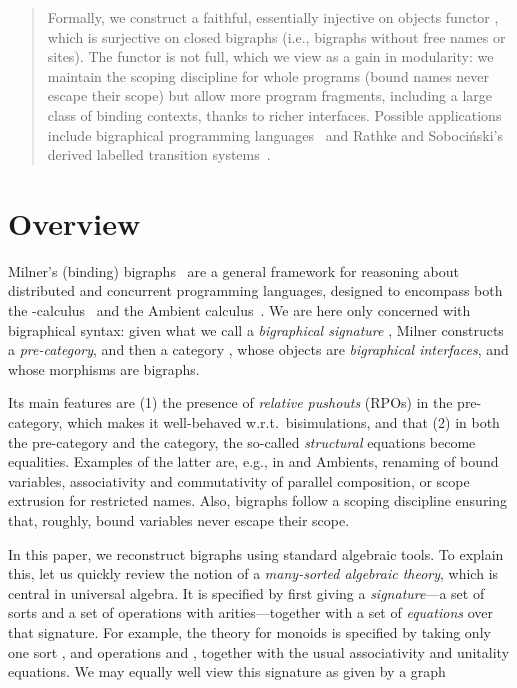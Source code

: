 \documentclass{llncs}
\begin{document}
\begin{abstract}
  Formally, we construct a faithful, essentially injective on objects
  functor , which is surjective on
  closed bigraphs (i.e., bigraphs without free names or sites).  The
  functor is not full, which we view as a gain in modularity: we
  maintain the scoping discipline for whole programs (bound names
  never escape their scope) but allow more program fragments,
  including a large class of binding contexts, thanks to richer
  interfaces.  Possible applications include bigraphical programming
  languages~\cite{Damgaard:Matching} and Rathke and Soboci\'{n}ski's
  derived labelled transition systems~\cite{modularLTS}.
  \end{abstract}

\section{Overview}
Milner's (binding) bigraphs~\cite{Milner:bigraphs} are a general
framework for reasoning about distributed and concurrent programming
languages, designed to encompass both the
-calculus~\cite{Milner:pi} and the Ambient
calculus~\cite{Ambients}.  We are here only concerned with bigraphical
syntax: given what we call a \emph{bigraphical signature} ,
Milner constructs a \emph{pre-category}, and then a category , whose objects are \emph{bigraphical interfaces}, and whose
morphisms are bigraphs.

Its main features are (1) the presence of \emph{relative pushouts}
(RPOs) in the pre-category, which makes it well-behaved w.r.t.\
bisimulations, and that (2) in both the pre-category and the category,
the so-called \emph{structural} equations become equalities. Examples
of the latter are, e.g., in  and Ambients, renaming of bound
variables, associativity and commutativity of parallel composition, or
scope extrusion for restricted names. Also, bigraphs follow a scoping
discipline ensuring that, roughly, bound variables never escape their
scope.

In this paper, we reconstruct bigraphs using standard algebraic tools.
To explain this, let us quickly review the notion of a
\emph{many-sorted algebraic theory}, which is central in universal
algebra. It is specified by first giving a \emph{signature}---a set of
sorts  and a set  of operations with arities---together with
a set of \emph{equations} over that signature. For example, the theory
for monoids is specified by taking only one sort , and operations
 and , together with the usual
associativity and unitality equations. We may equally well view this
signature as given by a graph
\end{document}
